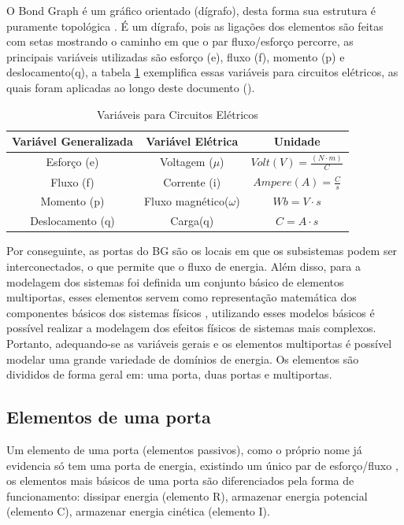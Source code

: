 O Bond Graph é um gráfico orientado (dígrafo), desta forma sua estrutura é puramente topológica \cite{borutzky2017bond}. É um dígrafo, pois as ligações dos elementos são feitas com setas mostrando o caminho em que o par fluxo/esforço percorre, as principais variáveis utilizadas são esforço (e), fluxo (f), momento (p) e deslocamento(q), a tabela \ref{tab:Variaveis_bg_eletronicos} exemplifica essas variáveis para circuitos elétricos, as quais foram aplicadas ao longo deste documento  (\cite{borutzky2011}). %

\begin{table}[H]
\centering
    \caption{Variáveis para Circuitos Elétricos}
    \label{tab:Variaveis_bg_eletronicos}
        \begin{tabular}{|c|c|c|}
        \hline
        \textbf{Variável Generalizada} & \textbf{Variável Elétrica} & \textbf{Unidade} \\ \hline
        Esforço (e) & Voltagem ($\mu$) & \(Volt(V) = \frac{(N \cdot m)}{C}\) \\ \hline
        Fluxo (f) & Corrente (i) & \(Ampere(A) = \frac{C}{s}\) \\ \hline
        Momento (p) & Fluxo magnético($\omega$) & \(Wb = V \cdot s\) \\ \hline
        Deslocamento (q) & Carga(q) & \(C = A \cdot s\) \\ \hline
    \end{tabular}
\end{table}

Por conseguinte, as portas do BG são os locais em que os subsistemas podem ser interconectados, o que permite que o fluxo de energia. Além disso, para a modelagem dos sistemas foi definida um conjunto básico de elementos multiportas, esses elementos servem como representação matemática dos componentes básicos dos sistemas físicos \cite{karnopp2012system}, utilizando esses modelos básicos é possível realizar a modelagem dos efeitos físicos de sistemas mais complexos. Portanto, adequando-se as variáveis gerais e os elementos multiportas é possível modelar uma grande variedade de domínios de energia. Os elementos são divididos de forma geral em: uma porta, duas portas e multiportas.

\subsection{Elementos de uma porta} \label{sec:1_porta}
Um elemento de uma porta (elementos passivos), como o próprio nome já evidencia só tem uma porta de energia, existindo um único par de esforço/fluxo \cite{karnopp2012system}, os elementos mais básicos de uma porta são diferenciados pela forma de funcionamento: dissipar energia (elemento R), armazenar energia potencial (elemento C), armazenar energia cinética (elemento I). 


